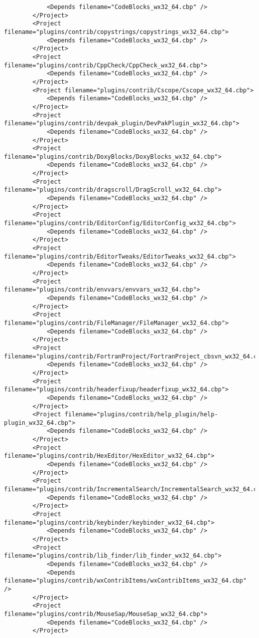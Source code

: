 {\begin{verbatim}
			<Depends filename="CodeBlocks_wx32_64.cbp" />
		</Project>
		<Project filename="plugins/contrib/copystrings/copystrings_wx32_64.cbp">
			<Depends filename="CodeBlocks_wx32_64.cbp" />
		</Project>
		<Project filename="plugins/contrib/CppCheck/CppCheck_wx32_64.cbp">
			<Depends filename="CodeBlocks_wx32_64.cbp" />
		</Project>
		<Project filename="plugins/contrib/Cscope/Cscope_wx32_64.cbp">
			<Depends filename="CodeBlocks_wx32_64.cbp" />
		</Project>
		<Project filename="plugins/contrib/devpak_plugin/DevPakPlugin_wx32_64.cbp">
			<Depends filename="CodeBlocks_wx32_64.cbp" />
		</Project>
		<Project filename="plugins/contrib/DoxyBlocks/DoxyBlocks_wx32_64.cbp">
			<Depends filename="CodeBlocks_wx32_64.cbp" />
		</Project>
		<Project filename="plugins/contrib/dragscroll/DragScroll_wx32_64.cbp">
			<Depends filename="CodeBlocks_wx32_64.cbp" />
		</Project>
		<Project filename="plugins/contrib/EditorConfig/EditorConfig_wx32_64.cbp">
			<Depends filename="CodeBlocks_wx32_64.cbp" />
		</Project>
		<Project filename="plugins/contrib/EditorTweaks/EditorTweaks_wx32_64.cbp">
			<Depends filename="CodeBlocks_wx32_64.cbp" />
		</Project>
		<Project filename="plugins/contrib/envvars/envvars_wx32_64.cbp">
			<Depends filename="CodeBlocks_wx32_64.cbp" />
		</Project>
		<Project filename="plugins/contrib/FileManager/FileManager_wx32_64.cbp">
			<Depends filename="CodeBlocks_wx32_64.cbp" />
		</Project>
 		<Project filename="plugins/contrib/FortranProject/FortranProject_cbsvn_wx32_64.cbp">
			<Depends filename="CodeBlocks_wx32_64.cbp" />
		</Project>
		<Project filename="plugins/contrib/headerfixup/headerfixup_wx32_64.cbp">
			<Depends filename="CodeBlocks_wx32_64.cbp" />
		</Project>
		<Project filename="plugins/contrib/help_plugin/help-plugin_wx32_64.cbp">
			<Depends filename="CodeBlocks_wx32_64.cbp" />
		</Project>
		<Project filename="plugins/contrib/HexEditor/HexEditor_wx32_64.cbp">
			<Depends filename="CodeBlocks_wx32_64.cbp" />
		</Project>
		<Project filename="plugins/contrib/IncrementalSearch/IncrementalSearch_wx32_64.cbp">
			<Depends filename="CodeBlocks_wx32_64.cbp" />
		</Project>
		<Project filename="plugins/contrib/keybinder/keybinder_wx32_64.cbp">
			<Depends filename="CodeBlocks_wx32_64.cbp" />
		</Project>
		<Project filename="plugins/contrib/lib_finder/lib_finder_wx32_64.cbp">
			<Depends filename="CodeBlocks_wx32_64.cbp" />
			<Depends filename="plugins/contrib/wxContribItems/wxContribItems_wx32_64.cbp" />
		</Project>
		<Project filename="plugins/contrib/MouseSap/MouseSap_wx32_64.cbp">
			<Depends filename="CodeBlocks_wx32_64.cbp" />
		</Project>

\end{verbatim}}

